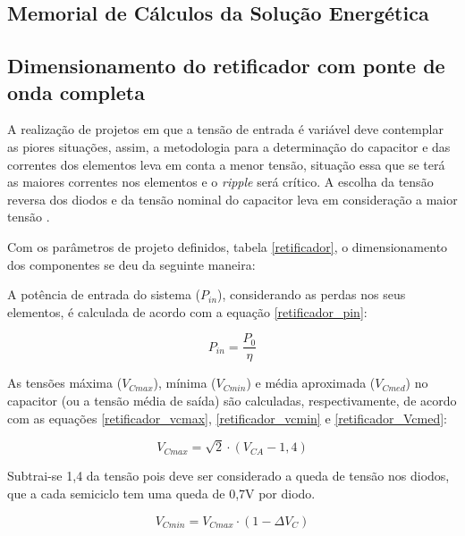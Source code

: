 \begin{apendicesenv}
\chapter{Memorial de Cálculos da Solução Energética}
\label{Energia_memorial}

\section{Dimensionamento do retificador com ponte de onda completa}

A realização de projetos em que a tensão de entrada é variável deve contemplar as piores situações, assim, a metodologia para a determinação do capacitor e das correntes dos elementos leva em conta a menor tensão, situação essa que se terá as maiores correntes nos elementos e o \textit{ripple} será crítico. A escolha da tensão reversa dos diodos e da tensão nominal do capacitor leva em consideração a maior tensão \cite{retificador}.

Com os parâmetros de projeto definidos, tabela \ref{retificador}, o dimensionamento dos componentes se deu da seguinte maneira:

A potência de entrada do sistema ($P_{in}$), considerando as perdas nos seus elementos, é calculada de acordo com a equação \ref{retificador_pin}:
    
    \begin{equation}
        P_{in} = \frac{P_{0}}{\eta}
        \label{retificador_pin}
    \end{equation}

As tensões máxima ($V_{Cmax}$), mínima ($V_{Cmin}$) e média aproximada ($V_{Cmed}$) no capacitor (ou a tensão média de saída) são calculadas, respectivamente, de acordo com as equações \ref{retificador_vcmax},  \ref{retificador_vcmin} e \ref{retificador_Vcmed}:
    
    \begin{equation}
        V_{Cmax} = \sqrt{2} \cdot \left( V_{CA} - 1,4 \right) 
        \label{retificador_vcmax}
    \end{equation}
    
Subtrai-se 1,4 da tensão pois deve ser considerado a queda de tensão nos diodos, que a cada semiciclo tem uma queda de 0,7V por diodo.

    
    \begin{equation}
        V_{Cmin} = V_{Cmax} \cdot \left( 1 - \Delta V_{C}  \right)
        \label{retificador_vcmin}
    \end{equation}
    

\end{apendicesenv}
